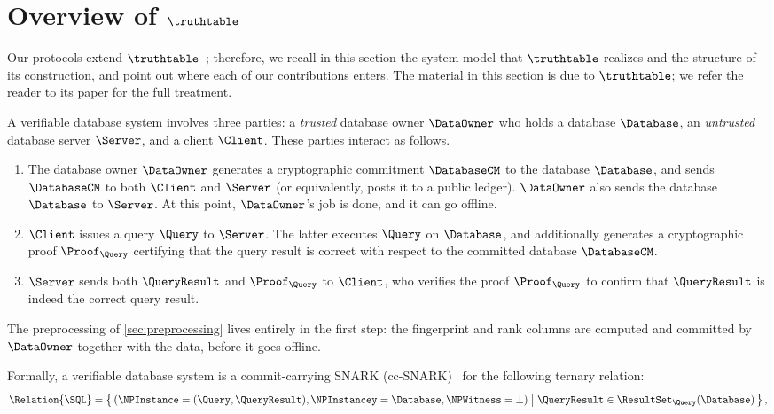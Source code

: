 \doclearpage
\section{Overview of \texorpdfstring{$\truthtable$}{TruthTable}}
\label{sec:overview}

Our protocols extend $\truthtable$~\cite{cryptoeprint:2026/1260}; therefore, we recall in this section the system model that $\truthtable$ realizes and the structure of its construction, and point out where each of our contributions enters. The material in this section is due to $\truthtable$; we refer the reader to its paper for the full treatment.

A verifiable database system involves three parties: a \emph{trusted} database owner $\DataOwner$ who holds a database $\Database$, an \emph{untrusted} database server $\Server$, and a client $\Client$.
These parties interact as follows.
\begin{enumerate}[nosep]
    \item The database owner $\DataOwner$ generates a cryptographic commitment $\DatabaseCM$ to the database $\Database$, and sends $\DatabaseCM$ to both $\Client$ and $\Server$ (or equivalently, posts it to a public ledger).
    $\DataOwner$ also sends the database $\Database$ to $\Server$.
    At this point, $\DataOwner$'s job is done, and it can go offline.
    \item $\Client$ issues a query $\Query$ to $\Server$. The latter executes $\Query$ on $\Database$, and additionally generates a cryptographic proof $\Proof_\Query$ certifying that the query result is correct with respect to the committed database $\DatabaseCM$.
    \item $\Server$ sends both $\QueryResult$ and $\Proof_\Query$ to $\Client$, who verifies the proof $\Proof_\Query$ to confirm that $\QueryResult$ is indeed the correct query result.
\end{enumerate}
The preprocessing of \cref{sec:preprocessing} lives entirely in the first step: the fingerprint and rank columns are computed and committed by $\DataOwner$ together with the data, before it goes offline.

Formally, a verifiable database system is a commit-carrying SNARK (cc-SNARK)~\cite{CampanelliFQ19} for the following ternary relation:
{\small
\begin{displaymath}
 \Relation{\SQL} = \left\{\,
    (
        \NPInstance = (\Query, \QueryResult),
        \NPInstancey = \Database,
        \NPWitness = \bot
    )
  \;\middle|\;
  \QueryResult \in \ResultSet_\Query(\Database)
\,\right\},
\end{displaymath}
}

